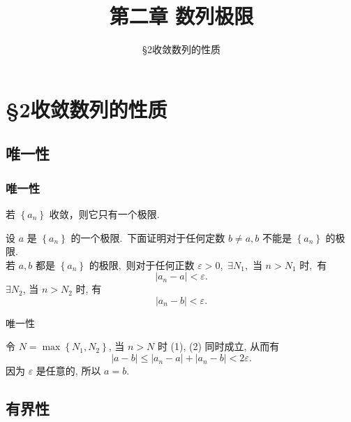 \documentclass[mathserif]{beamer}
\title
{第二章 \qquad 数列极限}
\author{}
\date{\sihao \S 2\qquad 收敛数列的性质}
\begin{document}
	
	\setlength\abovedisplayskip{2pt}
	\setlength\belowdisplayskip{2pt}

\begin{frame}
\Background
\titlepage  %
\end{frame}



\begin{frame}
\tableofcontents
\end{frame}




\section{\S 2收敛数列的性质}


\subsection{唯一性}
\begin{frame}
\frametitle{唯一性}
	\begin{thm}
		\suojin 若 $\left\{a_n\right\}$ 收敛，则它只有一个极限.
	\end{thm}
\pause 
\begin{proofs}
	\suojin 设 $a$ 是 $\left\{a_n\right\}$ 的一个极限.\ 下面证明对于任何定数 $b \neq a, b$ 不能是 $\left\{a_n\right\}$ 的极限.\\
	\suojin 若 $a, b$ 都是 $\left\{a_n\right\}$ 的极限,\ 则对于任何正数 $\varepsilon>0$,\ $\exists N_1$,\ 当 $n>N_1$ 时,\ 有
	$$\left|a_n-a\right|<\varepsilon.$$
	$\exists N_2$, 当 $n>N_2$ 时, 有
	$$\left|a_n-b\right|<\varepsilon . $$
\end{proofs}	
	
\end{frame}

\begin{frame}{唯一性}
\begin{proofs}
	\suojin 令 $N=\max \left\{N_1, N_2\right\}$, 当 $n>N$ 时 (1), (2) 同时成立, 从而有
	$$
	|a-b| \leq\left|a_n-a\right|+\left|a_n-b\right|<2 \varepsilon .
	$$
	\suojin 因为 $\varepsilon$ 是任意的, 所以 $a=b$. 
\end{proofs}  
\end{frame}

\subsection{有界性}
\end{document}
